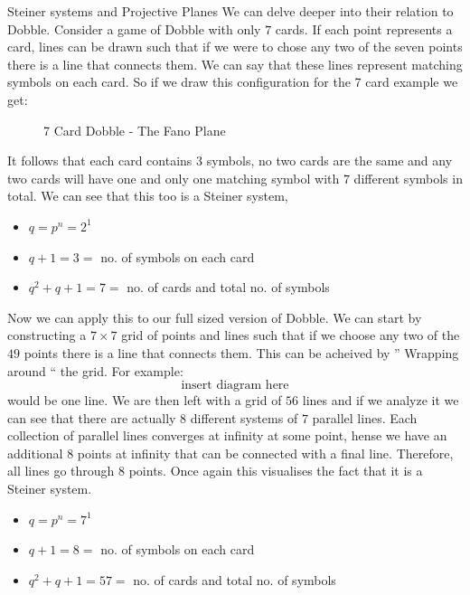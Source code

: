 \documentclass[final]{beamer}
\newlength{\colwidth}
\begin{document}
\begin{frame}[t]
\begin{columns}[t]
\begin{column}{\colwidth}
\begin{block}{Steiner systems and Projective Planes}
    We can delve deeper into their relation to Dobble.
Consider a game of Dobble with only $7$ cards. If each point represents a card, lines can be drawn such that if we were to chose any two of the seven points there is a line that connects them. We can say that these lines represent matching symbols on each card. So if we draw this configuration for the 7 card example we get:
    \begin{figure}
      \centering
      \caption{7 Card Dobble - The Fano Plane}
    \end{figure}
It follows that each card contains $3$ symbols, no two cards are the same and any two cards will have one and only one matching symbol with $7$ different symbols in total.
We can see that this too is a Steiner system, 
\begin{itemize}
    \item $q = p^n = 2^1$
    \item $q + 1 = 3 =$ no. of symbols on each card
    \item $q^2 + q + 1 = 7 =$ no. of cards and total no. of symbols
\end{itemize}
Now we can apply this to our full sized version of Dobble.
We can start by constructing a $7\times7$ grid of points and lines such that if we choose any two of the $49$ points there is a line that connects them. This can be acheived by '' Wrapping around `` the grid.
For example:
\[\text{insert diagram here}\]
would be one line.
We are then left with a grid of $56$ lines and if we analyze it we can see that there are actually $8$ different systems of $7$ parallel lines. Each collection of parallel lines converges at infinity at some point,
hense we have an additional $8$ points at infinity that can be connected with a final line. Therefore, all lines go through $8$ points.
Once again this visualises the fact that it is a Steiner system.
\begin{itemize}
    \item $q = p^n = 7^1$
    \item $q + 1 = 8 =$ no. of symbols on each card
    \item $q^2 + q + 1 = 57 =$ no. of cards and total no. of symbols
\end{itemize}


\end{block}
\end{column}
\end{columns}
\end{frame}
\end{document}
